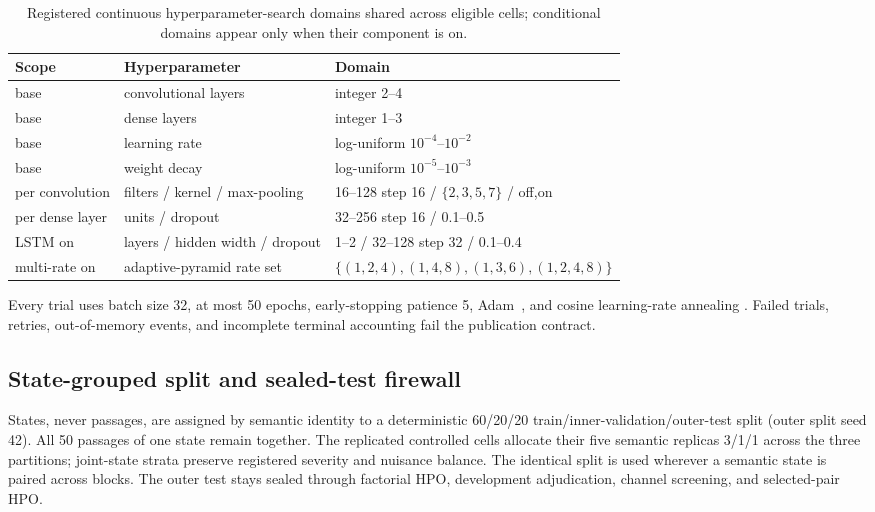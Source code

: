 \begin{table}[htbp]
\centering
\caption{Registered continuous hyperparameter-search domains shared across
eligible cells; conditional domains appear only when their component is on.}
\label{tab:search_space}
\small
\begin{tabular}{lll}
\toprule
Scope & Hyperparameter & Domain \\
\midrule
base & convolutional layers & integer 2--4 \\
base & dense layers & integer 1--3 \\
base & learning rate & log-uniform $10^{-4}$--$10^{-2}$ \\
base & weight decay & log-uniform $10^{-5}$--$10^{-3}$ \\
per convolution & filters / kernel / max-pooling & 16--128 step 16 / $\{2,3,5,7\}$ / off,on \\
per dense layer & units / dropout & 32--256 step 16 / 0.1--0.5 \\
LSTM on & layers / hidden width / dropout & 1--2 / 32--128 step 32 / 0.1--0.4 \\
multi-rate on & adaptive-pyramid rate set & $\{(1,2,4),(1,4,8),(1,3,6),(1,2,4,8)\}$ \\
\bottomrule
\end{tabular}
\end{table}

Every trial uses batch size 32, at most 50 epochs, early-stopping patience 5,
Adam~\cite{kingma2015adam}, and cosine learning-rate annealing
\cite{loshchilov2017sgdr}. Failed trials, retries, out-of-memory events, and
incomplete terminal accounting fail the publication contract.

\subsection{State-grouped split and sealed-test firewall}
\label{sec:split}

States, never passages, are assigned by semantic identity to a deterministic
60/20/20 train/inner-validation/outer-test split (outer split seed 42). All 50
passages of one state remain together. The replicated controlled cells allocate
their five semantic replicas 3/1/1 across the three partitions; joint-state
strata preserve registered severity and nuisance balance. The identical split
is used wherever a semantic state is paired across blocks. The outer test stays
sealed through factorial HPO, development adjudication, channel screening, and
selected-pair HPO.

